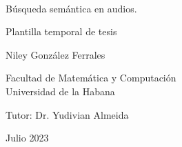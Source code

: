 \documentclass[11pt,a4paper,oldfontcommands]{memoir}
\begin{document}
%
%
\thispagestyle{empty}

{%
\sffamily
\centering
\Large

~\vspace{\fill}

{\huge 
Búsqueda semántica en audios.
}

{\LARGE
Plantilla temporal de tesis
}

\vspace{2.5cm}

{\LARGE
Niley González Ferrales
}

\vspace{3.5cm}

Facultad de Matemática y Computación\\
Universidad de la Habana
\vspace{3.5cm}

Tutor: Dr. Yudivian Almeida

\vspace{\fill}

Julio 2023


}%

% 
\end{document}

